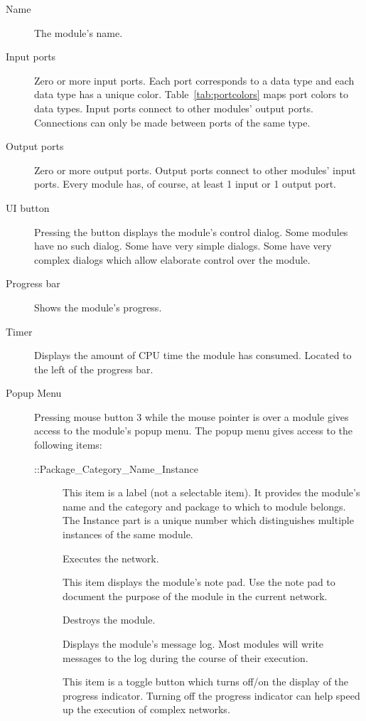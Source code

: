 \begin{description}
\item[Name] The module's name.
\item[Input ports] Zero or more input ports.  Each port corresponds to a
  data type and each data type has a unique color.
  Table~\ref{tab:portcolors} maps port colors to data types.  Input ports
  connect to other modules' output ports.  Connections can only be made
  between ports of the same type.
\item[Output ports] Zero or more output ports.  Output ports connect to
  other modules' input ports.  Every module has, of course, at least 1 input
  or 1 output port.
\item[UI button] Pressing the  button displays the module's
  control dialog. Some modules have no such dialog. Some have very
  simple dialogs.  Some have very complex dialogs which allow elaborate
  control over the module.  
\item[Progress bar] Shows the module's progress.
\item[Timer] Displays the amount of CPU time the module has consumed.
  Located to the left of the progress bar.
\item[Popup Menu] Pressing mouse button 3 while the mouse
  pointer is over a module gives access to the module's popup menu.  The
  popup menu gives access to the following items:
  \begin{description}
  \item[::Package_Category_Name_Instance] This item is a label (not a
    selectable item).  It provides the module's name and the category and
    package to which to module belongs.  The Instance part is a unique
    number which distinguishes multiple instances of the same module.
  \item[] Executes the network.
  \item[] This item displays the module's note pad.  Use the note pad
    to document the purpose of the module in the current network.
  \item[] Destroys the module.
  \item[] Displays the module's message log.  Most modules will
    write messages to the log during the course of their execution.
  \item[] This item is a toggle button which turns off/on the
    display of the progress indicator.  Turning off the progress indicator
    can help speed up the execution of complex networks.
  \end{description}
\end{description}

